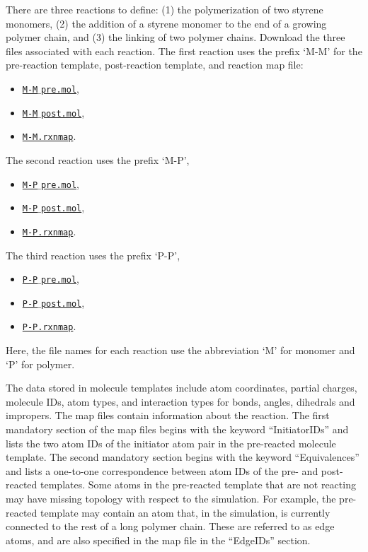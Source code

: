 \documentclass[9pt,tutorial]{livecoms}
\newcommand{\dwlcmd}[1]{\textcolor{download}{\texttt{#1}}} %
\newcommand{\filepath}{https://raw.githubusercontent.com/lammpstutorials/lammpstutorials-article/main/files/}
\begin{document}
There are three reactions to define: (1) the polymerization of two styrene monomers,
(2) the addition of a styrene monomer to the end of a growing polymer chain, and (3) the
linking of two polymer chains.  Download the three files associated with each reaction.
The first reaction uses the prefix `M-M' for the pre-reaction template,
post-reaction template, and reaction map file:
\begin{itemize}
\item \href{\filepath tutorial8/M-M_pre.mol}{\dwlcmd{M-M$\_$pre.mol}},
\item \href{\filepath tutorial8/M-M_post.mol}{\dwlcmd{M-M$\_$post.mol}},
\item \href{\filepath tutorial8/M-M.rxnmap}{\dwlcmd{M-M.rxnmap}}.
\end{itemize}
The second reaction uses the prefix `M-P',
\begin{itemize}
\item \href{\filepath tutorial8/M-P_pre.mol}{\dwlcmd{M-P$\_$pre.mol}},
\item \href{\filepath tutorial8/M-P_post.mol}{\dwlcmd{M-P$\_$post.mol}},
\item \href{\filepath tutorial8/M-P.rxnmap}{\dwlcmd{M-P.rxnmap}}.
\end{itemize}
The third reaction uses the prefix `P-P',
\begin{itemize}
\item \href{\filepath tutorial8/P-P_pre.mol}{\dwlcmd{P-P$\_$pre.mol}},
\item \href{\filepath tutorial8/P-P_post.mol}{\dwlcmd{P-P$\_$post.mol}},
\item \href{\filepath tutorial8/P-P.rxnmap}{\dwlcmd{P-P.rxnmap}}.
\end{itemize}
Here, the file names for each reaction use the abbreviation `M' for monomer and `P'
for polymer.

\begin{note}
{\color{blue}The data stored in molecule templates include atom coordinates,
partial charges, molecule IDs, atom types, and interaction types for bonds,
angles, dihedrals and impropers.  The map files contain information about
the reaction.  The first mandatory section of the map files begins with the
keyword “InitiatorIDs” and lists the two atom IDs of the initiator atom pair
in the pre-reacted molecule template.  The second mandatory section begins
with the keyword “Equivalences” and lists a one-to-one correspondence between
atom IDs of the pre- and post-reacted templates.  Some atoms in the pre-reacted
template that are not reacting may have missing topology with respect to the
simulation.  For example, the pre-reacted template may contain an atom that,
in the simulation, is currently connected to the rest of a long polymer
chain.  These are referred to as edge atoms, and are also specified in the
map file in the “EdgeIDs” section.}
\end{note}
\end{document}
